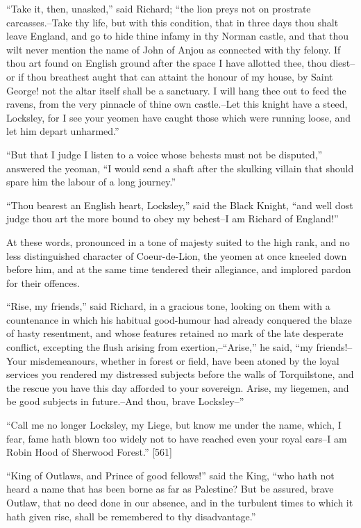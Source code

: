 ``Take it, then, unasked,'' said Richard; ``the lion preys not on
prostrate carcasses.--Take thy life, but with this condition, that in
three days thou shalt leave England, and go to hide thine infamy in thy
Norman castle, and that thou wilt never mention the name of John of
Anjou as connected with thy felony. If thou art found on English ground
after the space I have allotted thee, thou diest--or if thou breathest
aught that can attaint the honour of my house, by Saint George! not the
altar itself shall be a sanctuary. I will hang thee out to feed the
ravens, from the very pinnacle of thine own castle.--Let this knight
have a steed, Locksley, for I see your yeomen have caught those which
were running loose, and let him depart unharmed.''

``But that I judge I listen to a voice whose behests must not be
disputed,'' answered the yeoman, ``I would send a shaft after the
skulking villain that should spare him the labour of a long journey.''

``Thou bearest an English heart, Locksley,'' said the Black Knight,
``and well dost judge thou art the more bound to obey my behest--I am
Richard of England!''

At these words, pronounced in a tone of majesty suited to the high rank,
and no less distinguished character of Coeur-de-Lion, the yeomen at once
kneeled down before him, and at the same time tendered their allegiance,
and implored pardon for their offences.

``Rise, my friends,'' said Richard, in a gracious tone, looking on them
with a countenance in which his habitual good-humour had already
conquered the blaze of hasty resentment, and whose features retained no
mark of the late desperate conflict, excepting the flush arising from
exertion,--``Arise,'' he said, ``my friends!--Your misdemeanours,
whether in forest or field, have been atoned by the loyal services you
rendered my distressed subjects before the walls of Torquilstone, and
the rescue you have this day afforded to your sovereign. Arise, my
liegemen, and be good subjects in future.--And thou, brave Locksley--''

``Call me no longer Locksley, my Liege, but know me under the name,
which, I fear, fame hath blown too widely not to have reached even your
royal ears--I am Robin Hood of Sherwood Forest.'' {[}561{]}

``King of Outlaws, and Prince of good fellows!'' said the King, ``who
hath not heard a name that has been borne as far as Palestine? But be
assured, brave Outlaw, that no deed done in our absence, and in the
turbulent times to which it hath given rise, shall be remembered to thy
disadvantage.''

